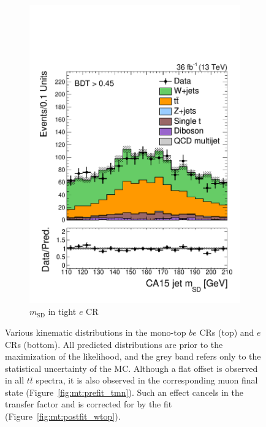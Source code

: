 \begin{figure}[]
\begin{center}
\begin{subfigure}[t]{0.32\textwidth}
            \includegraphics[width=\textwidth]{figures/monotop/prefit/singleelectronw_tight_fj1MSD.pdf}
            \caption{$m_\mathrm{SD}$ in tight $e$ CR}
        \end{subfigure}
        \caption{Various kinematic distributions in the mono-top $be$ CRs (top) and $e$ CRs (bottom).
                 All predicted distributions are prior to the maximization of the likelihood, and the grey band refers only to the statistical uncertainty of the MC.
                 Although a flat offset is observed in all $t\bar{t}$ spectra, it is also observed in the corresponding muon final state (Figure~\ref{fig:mt:prefit_tmn}).
                 Such an effect cancels in the transfer factor and is corrected for by the fit (Figure~\ref{fig:mt:postfit_wtop}).}
        \label{fig:mt:prefit_en}
    \end{center}
\end{figure}


